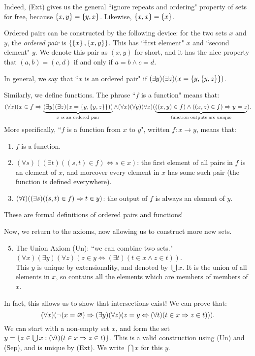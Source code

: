 \documentclass{article}
\begin{document}
\begin{remark}
    Indeed, (Ext) gives us the general ``ignore repeats and ordering" property of sets for free, because $\left\lbrace x, y \right\rbrace = \left\lbrace y, x \right\rbrace$. Likewise, $\left\lbrace x, x \right\rbrace = \left\lbrace x \right\rbrace$.
    
    Ordered pairs can be constructed by the following device: for the two sets $x$ and $y$, the \textit{ordered pair} is $\left\lbrace \left\lbrace x \right\rbrace, \left\lbrace x,y \right\rbrace \right\rbrace$. This has ``first element" $x$ and ``second element" $y$. We denote this pair as $(x, y)$ for short, and it has the nice property that $(a, b) = (c, d)$ if and only if $a=b \land c=d$.
    
    In general, we say that ``$x$ is an ordered pair" if $(\exists y)(\exists z)(x = \left\lbrace y, \left\lbrace y, z \right\rbrace \right\rbrace)$.
    
    Similarly, we define functions. The phrase ``$f$ is a function" means that:
    \[
	(\forall x)(
	x \in f \Rightarrow
	\underbrace{(\exists y)(\exists z)(x = \left\lbrace y, \left\lbrace y, z \right\rbrace \right\rbrace))}_{\text{$x$ is an ordered pair}}
	\land 
	(\forall x)(\forall y)(\forall z) (
	\underbrace{((x, y) \in f) \land ((x, z) \in f) \Rightarrow y=z}_{\text{function outputs are unique}}).
	\]
	More specifically, ``$f$ is a function from $x$ to $y$", written $f: x \to y$, means that:
	\begin{enumerate}
	    \item $f$ is a function.
	    \item $(\forall s)((\exists t)((s, t) \in f) \Leftrightarrow s \in x)$: the first element of all pairs in $f$ is an element of $x$, and moreover every element in $x$ has some such pair (the function is defined everywhere).
	    \item $(\forall t)((\exists s)((s, t) \in f) \Rightarrow t \in y)$: the output of $f$ is always an element of $y$.
	\end{enumerate}
	These are formal definitions of ordered pairs and functions!
\end{remark}

Now, we return to the axioms, now allowing us to construct more new sets.

\begin{enumerate}
	\setcounter{enumi}{4}
    \item The Union Axiom (Un): ``we can combine two sets." \\
    $(\forall x)(\exists y)(\forall z)(z \in y \Leftrightarrow (\exists t)(t \in x \land z \in t))$. \\
    This $y$ is unique by extensionality, and denoted by $\bigcup x$. It is the union of all elements in $x$, so contains all the elements which are members of members of $x$.
\end{enumerate}
In fact, this allows us to show that intersections exist! We can prove that:
\[
(\forall x)(\lnot(x = \varnothing) \Rightarrow (\exists y)(\forall z)(z = y \Leftrightarrow (\forall t)(t \in x \Rightarrow z \in t))).
\]
We can start with a non-empty set $x$, and form the set $y = \left\lbrace z \in \bigcup x : (\forall t)(t \in x \Rightarrow z \in t) \right\rbrace$. This is a valid construction using (Un) and (Sep), and is unique by (Ext). We write $\bigcap x$ for this $y$.
\end{document}
